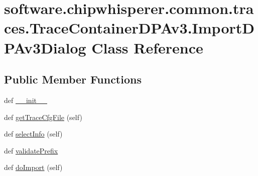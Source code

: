 \hypertarget{classsoftware_1_1chipwhisperer_1_1common_1_1traces_1_1TraceContainerDPAv3_1_1ImportDPAv3Dialog}{}\section{software.\+chipwhisperer.\+common.\+traces.\+Trace\+Container\+D\+P\+Av3.\+Import\+D\+P\+Av3\+Dialog Class Reference}
\label{classsoftware_1_1chipwhisperer_1_1common_1_1traces_1_1TraceContainerDPAv3_1_1ImportDPAv3Dialog}
\subsection*{Public Member Functions}
\begin{DoxyCompactItemize}
\item 
def \hyperlink{classsoftware_1_1chipwhisperer_1_1common_1_1traces_1_1TraceContainerDPAv3_1_1ImportDPAv3Dialog_a7452a09e45889a59478ffa435ec0bd9e}{\+\_\+\+\_\+init\+\_\+\+\_\+}
\item 
def \hyperlink{classsoftware_1_1chipwhisperer_1_1common_1_1traces_1_1TraceContainerDPAv3_1_1ImportDPAv3Dialog_ae41e4856bad7cfabb5af6bb8b4638571}{get\+Trace\+Cfg\+File} (self)
\item 
def \hyperlink{classsoftware_1_1chipwhisperer_1_1common_1_1traces_1_1TraceContainerDPAv3_1_1ImportDPAv3Dialog_aabc8a20ae48c90e69d13b4762d197c33}{select\+Info} (self)
\item 
def \hyperlink{classsoftware_1_1chipwhisperer_1_1common_1_1traces_1_1TraceContainerDPAv3_1_1ImportDPAv3Dialog_a6a1c6202537792b6007a0026ec0d2d3d}{validate\+Prefix}
\item 
def \hyperlink{classsoftware_1_1chipwhisperer_1_1common_1_1traces_1_1TraceContainerDPAv3_1_1ImportDPAv3Dialog_a27dcda3d2c45c033757cea03b9f67cda}{do\+Import} (self)
\end{DoxyCompactItemize}
